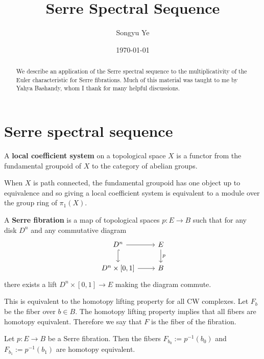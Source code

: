 \documentclass[12pt]{article}
\begin{document}
\rhead{\today}
\cfoot{\thepage}

\title{Serre Spectral Sequence} 

\author{Songyu Ye}
\date{\today}
\maketitle


\begin{abstract}
We describe an application of the Serre spectral sequence to the multiplicativity of the Euler characteristic for Serre fibrations. Much of this material was taught to me by Yahya Bashandy, whom I thank for many helpful discussions.
\end{abstract}

\tableofcontents

\section{Serre spectral sequence}
\begin{definition}
    A \textbf{local coefficient system} on a topological space $X$ is a functor from the fundamental groupoid of $X$ to the category of abelian groups.
\end{definition}
When $X$ is path connected, the fundamental groupoid has one object up to equivalence and so giving a local coefficient system is equivalent to a module over the group ring of $\pi_1(X)$. 

\begin{definition}
A \textbf{Serre fibration} is a map of topological spaces $p:E \to B$ such that for any disk $D^n$ and any commutative diagram
    \[\begin{tikzcd}
    D^n \arrow[r] \arrow[d, hook] & E \arrow[d, "p"] \\
    D^n \times [0,1] \arrow[r] & B
    \end{tikzcd}\]
    there exists a lift $D^n \times [0,1] \to E$ making the diagram commute. 
\end{definition}
This is equivalent to the homotopy lifting property for all CW complexes. Let $F_b$ be the fiber over $b \in B$. The homotopy lifting property implies that all fibers are homotopy equivalent. Therefore we say that $F$ is the fiber of the fibration.

\begin{proposition}
Let $p: E \to B$ be a Serre fibration. Then the fibers $F_{b_0} := p^{-1}(b_0)$ and $F_{b_1} := p^{-1}(b_1)$ are homotopy equivalent.
\end{proposition}
\end{document}
